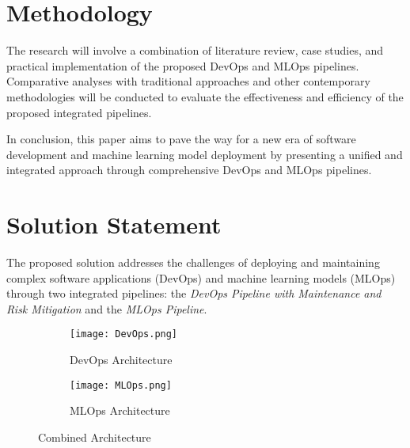 \documentclass[12pt, letterpaper]{article}
\begin{document}
\section{Methodology}
The research will involve a combination of literature review, case studies, and practical implementation of the proposed DevOps and MLOps pipelines. Comparative analyses with traditional approaches and other contemporary methodologies will be conducted to evaluate the effectiveness and efficiency of the proposed integrated pipelines.

In conclusion, this paper aims to pave the way for a new era of software development and machine learning model deployment by presenting a unified and integrated approach through comprehensive DevOps and MLOps pipelines.


\section{Solution Statement}

The proposed solution addresses the challenges of deploying and maintaining complex software applications (DevOps) and machine learning models (MLOps) through two integrated pipelines: the \textit{DevOps Pipeline with Maintenance and Risk Mitigation} and the \textit{MLOps Pipeline}.




\begin{figure}
    \begin{subfigure}{0.48\textwidth}
        \centering
        \texttt{[image: DevOps.png]}
        \caption{DevOps Architecture}
    \end{subfigure}
    \hfill
    \begin{subfigure}{0.48\textwidth}
        \centering
        \texttt{[image: MLOps.png]}
        \caption{MLOps Architecture}
    \end{subfigure}
    \caption{Combined Architecture}
\end{figure}



\end{document}
